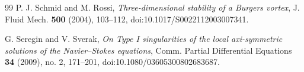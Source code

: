 \documentclass[11pt]{amsart}
\theoremstyle{plain}
\theoremstyle{definition}
\theoremstyle{remark}
\numberwithin{equation}{section}
\begin{document}
\begin{thebibliography}{99}
P. J. Schmid and M. Rossi,
\emph{Three-dimensional stability of a Burgers vortex},
J. Fluid Mech. \textbf{500} (2004), 103--112,
doi:10.1017/S0022112003007341.

G. Seregin and V. Sverak,
\emph{On Type I singularities of the local axi-symmetric solutions of the
Navier--Stokes equations},
Comm. Partial Differential Equations \textbf{34} (2009), no. 2, 171--201,
doi:10.1080/03605300802683687.

\end{thebibliography}
\end{document}
